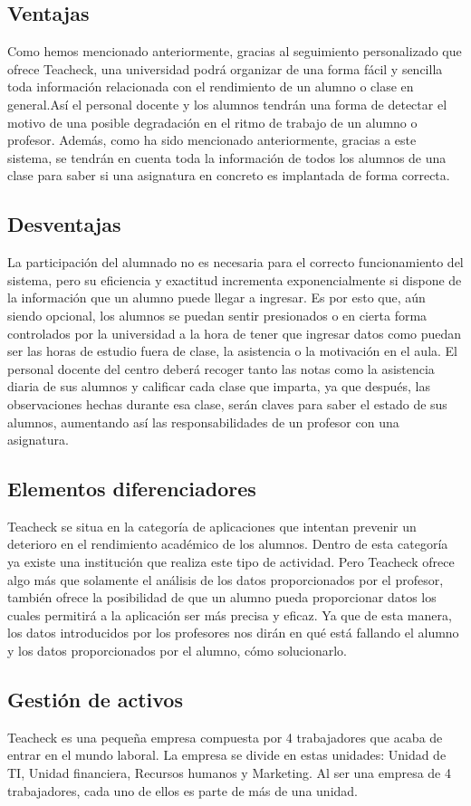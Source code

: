 \subsection{Ventajas}
Como hemos mencionado anteriormente, gracias al seguimiento
personalizado que ofrece Teacheck, una universidad podrá organizar de
una forma fácil y sencilla toda información relacionada con el
rendimiento de un alumno o clase en general.Así el personal docente y
los alumnos tendrán una forma de detectar el motivo de una posible
degradación en el ritmo de trabajo de un alumno o profesor.  Además,
como ha sido mencionado anteriormente, gracias a este sistema, se
tendrán en cuenta toda la información de todos los alumnos de una
clase para saber si una asignatura en concreto es implantada de forma
correcta.
\subsection{Desventajas}
La participación del alumnado no es necesaria para el correcto
funcionamiento del sistema, pero su eficiencia y exactitud incrementa
exponencialmente si dispone de la información que un alumno puede
llegar a ingresar. Es por esto que, aún siendo opcional, los alumnos
se puedan sentir presionados o en cierta forma controlados por la
universidad a la hora de tener que ingresar datos como puedan ser las
horas de estudio fuera de clase, la asistencia o la motivación en el
aula.  El personal docente del centro deberá recoger tanto las notas
como la asistencia diaria de sus alumnos y calificar cada clase que
imparta, ya que después, las observaciones hechas durante esa clase,
serán claves para saber el estado de sus alumnos, aumentando así las
responsabilidades de un profesor con una asignatura.
\subsection{Elementos diferenciadores}
Teacheck se situa en la categoría de aplicaciones que intentan
prevenir un deterioro en el rendimiento académico de los
alumnos. Dentro de esta categoría ya existe una institución que
realiza este tipo de actividad. Pero Teacheck ofrece algo más que
solamente el análisis de los datos proporcionados por el profesor,
también ofrece la posibilidad de que un alumno pueda proporcionar
datos los cuales permitirá a la aplicación ser más precisa y eficaz.
Ya que de esta manera, los datos introducidos por los profesores nos
dirán en qué está fallando el alumno y los datos proporcionados por el
alumno, cómo solucionarlo.
\subsection{Gestión de activos}
Teacheck es una pequeña empresa compuesta por 4 trabajadores que acaba de entrar en el mundo laboral. La empresa se divide en estas unidades: Unidad de TI, Unidad financiera, Recursos humanos y Marketing. Al ser una empresa de 4 trabajadores, cada uno de ellos es parte de más de una unidad. 

